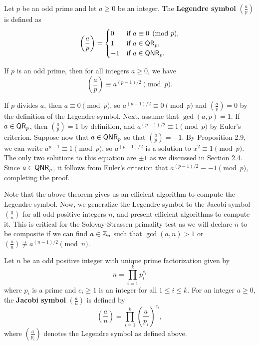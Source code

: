 \begin{defn}
Let $p$ be an odd prime and let $a \geq 0$ be an integer. The {\bf Legendre symbol} 
$(\frac ap)$ is defined as 
\[ \left( \frac ap \right) = \begin{cases} 0 & \text{if $a \equiv 0 \pmod p$,} \\ 1 & \text{if $a \in {\sf QR}_p$,} \\ -1 & \text{if $a \in {\sf QNR}_p$.} \end{cases} \]
\end{defn}

\begin{thm}
If $p$ is an odd prime, then for all integers $a \geq 0$, we have 
\[ \left( \frac ap \right) \equiv a^{(p-1)/2} \pmod p. \]
\end{thm}
\begin{pf}
If $p$ divides $a$, then $a \equiv 0 \pmod p$, so $a^{(p-1)/2} \equiv 0 \pmod p$ and 
$(\frac ap) = 0$ by the definition of the Legendre symbol. Next, assume that $\gcd(a, p) = 1$. 
If $a \in {\sf QR}_p$, then $(\frac ap) = 1$ by definition, and $a^{(p-1)/2} \equiv 1 \pmod p$ 
by Euler's criterion. Suppose now that $a \in {\sf QNR}_p$ so that $(\frac ap) = -1$. By Proposition 
2.9, we can write $a^{p-1} \equiv 1 \pmod p$, so $a^{(p-1)/2}$ is a solution to $x^2 \equiv 1 
\pmod p$. The only two solutions to this equation are $\pm1$ as we discussed in Section 2.4. 
Since $a \in {\sf QNR}_p$, it follows from Euler's criterion that $a^{(p-1)/2} \equiv -1 \pmod p$,
completing the proof.
\end{pf}

Note that the above theorem gives us an efficient algorithm to compute the Legendre symbol. 
Now, we generalize the Legendre symbol to the Jacobi symbol $\left(\frac an\right)$ for all odd positive integers 
$n$, and present efficient algorithms to compute it. This is critical for the Solovay-Strassen 
primality test as we will declare $n$ to be composite if we can find $a \in \mathbb{Z}_n$ such that 
$\gcd(a, n) > 1$ or $\left(\frac an\right) \not\equiv a^{(n-1)/2} \pmod n$. 

\begin{defn}
Let $n$ be an odd positive integer with unique prime factorization given by 
\[ n = \prod_{i=1}^k p_i^{e_i} \]
where $p_i$ is a prime and $e_i \geq 1$ is an integer for all $1 \leq i \leq k$. 
For an integer $a \geq 0$, the {\bf Jacobi symbol} $\left(\frac an\right)$ is defined by 
\[ \left( \frac an \right) = \prod_{i=1}^k \left( \frac a{p_i} \right)^{\!e_i}, \]
where $(\frac a{p_i})$ denotes the Legendre symbol as defined above. 
\end{defn}

